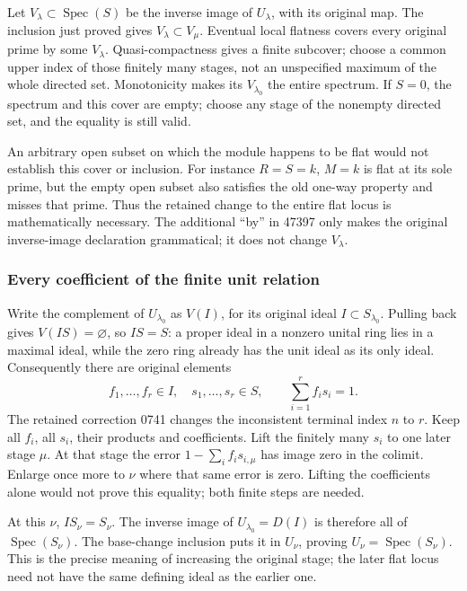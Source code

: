 Let \(V_\lambda\subset\operatorname{Spec}(S)\) be the inverse image of \(U_\lambda\), with its original map. The inclusion just proved gives \(V_\lambda\subset V_\mu\). Eventual local flatness covers every original prime by some \(V_\lambda\). Quasi-compactness gives a finite subcover; choose a common upper index of those finitely many stages, not an unspecified maximum of the whole directed set. Monotonicity makes its \(V_{\lambda_0}\) the entire spectrum. If \(S=0\), the spectrum and this cover are empty; choose any stage of the nonempty directed set, and the equality is still valid.

An arbitrary open subset on which the module happens to be flat would not establish this cover or inclusion. For instance \(R=S=k\), \(M=k\) is flat at its sole prime, but the empty open subset also satisfies the old one-way property and misses that prime. Thus the retained change to the entire flat locus is mathematically necessary. The additional ``by'' in 47397 only makes the original inverse-image declaration grammatical; it does not change \(V_\lambda\).

\subsubsection{Every coefficient of the finite unit relation}\label{every-coefficient-of-the-finite-unit-relation}

Write the complement of \(U_{\lambda_0}\) as \(V(I)\), for its original ideal \(I\subset S_{\lambda_0}\). Pulling back gives \(V(IS)=\varnothing\), so \(IS=S\): a proper ideal in a nonzero unital ring lies in a maximal ideal, while the zero ring already has the unit ideal as its only ideal. Consequently there are original elements \[
 f_1,\ldots,f_r\in I,\quad s_1,\ldots,s_r\in S,
 \qquad\sum_{i=1}^r f_i s_i=1.
\] The retained correction 0741 changes the inconsistent terminal index \(n\) to \(r\). Keep all \(f_i\), all \(s_i\), their products and coefficients. Lift the finitely many \(s_i\) to one later stage \(\mu\). At that stage the error \(1-\sum_i f_i s_{i,\mu}\) has image zero in the colimit. Enlarge once more to \(\nu\) where that same error is zero. Lifting the coefficients alone would not prove this equality; both finite steps are needed.

At this \(\nu\), \(IS_\nu=S_\nu\). The inverse image of \(U_{\lambda_0}=D(I)\) is therefore all of \(\operatorname{Spec}(S_\nu)\). The base-change inclusion puts it in \(U_\nu\), proving \(U_\nu=\operatorname{Spec}(S_\nu)\). This is the precise meaning of increasing the original stage; the later flat locus need not have the same defining ideal as the earlier one.

